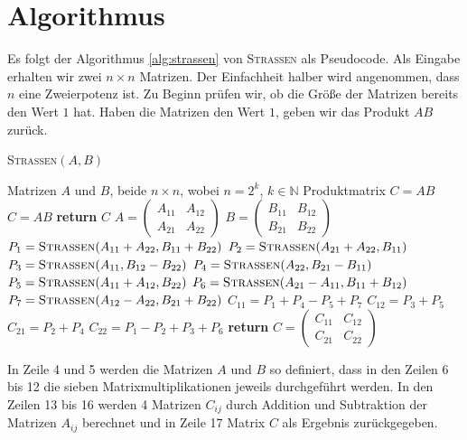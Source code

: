 \documentclass{scrartcl}
\begin{document}
\section{Algorithmus}
Es folgt der Algorithmus \ref{alg:strassen} von \textsc{Strassen}  als Pseudocode. Als Eingabe erhalten wir zwei $n \times n$ Matrizen. Der Einfachheit halber wird angenommen, dass $n$ eine Zweierpotenz ist. Zu Beginn prüfen wir, ob die Größe der Matrizen bereits den Wert $1$ hat. Haben die Matrizen den Wert $1$, geben wir das Produkt $A B$ zurück.
\begin{algorithm}
	\caption{\textsc{Strassen}$(A, B)$}
	\label{alg:strassen}
	\begin{algorithmic}[1]
		\Require Matrizen $A$ und $B$, beide $n \times n$, wobei $n = 2^k$, $k \in \mathbb{N}$
		\Ensure Produktmatrix $C = AB$
		 $C = AB$ %
		\State \textbf{return} $C$
		\EndIf
		\State $A = \begin{pmatrix} A_{11} & A_{12} \\ A_{21} & A_{22} \end{pmatrix}$
		\State $B = \begin{pmatrix} B_{11} & B_{12} \\ B_{21} & B_{22} \end{pmatrix}$
		\State $P_1 = \textsc{Strassen}(A_{11} + A_{22}, B_{11} + B_{22})$
		\State $P_2 = \textsc{Strassen}(A_{21} + A_{22}, B_{11})$
		\State $P_3 = \textsc{Strassen}(A_{11}, B_{12} - B_{22})$
		\State $P_4 = \textsc{Strassen}(A_{22}, B_{21} - B_{11})$
		\State $P_5 = \textsc{Strassen}(A_{11} + A_{12}, B_{22})$
		\State $P_6 = \textsc{Strassen}(A_{21} - A_{11}, B_{11} + B_{12})$
		\State $P_7 = \textsc{Strassen}(A_{12} - A_{22}, B_{21} + B_{22})$
		\State $C_{11} = P_1 + P_4 - P_5 + P_7$
		\State $C_{12} = P_3 + P_5$
		\State $C_{21} = P_2 + P_4$
		\State $C_{22} = P_1 - P_2 + P_3 + P_6$
		\State \textbf{return} $C = \begin{pmatrix} C_{11} & C_{12} \\ C_{21} & C_{22} \end{pmatrix}$
	\end{algorithmic}
\end{algorithm}
In Zeile 4 und 5 werden die Matrizen $A$ und $B$ so definiert, dass in den Zeilen 6 bis 12 die sieben Matrixmultiplikationen jeweils durchgeführt werden. In den Zeilen 13 bis 16 werden 4 Matrizen $C_{ij}$ durch Addition und Subtraktion der Matrizen $A_{ij}$ berechnet und in Zeile 17 Matrix $C$ als Ergebnis zurückgegeben.
\end{document}
